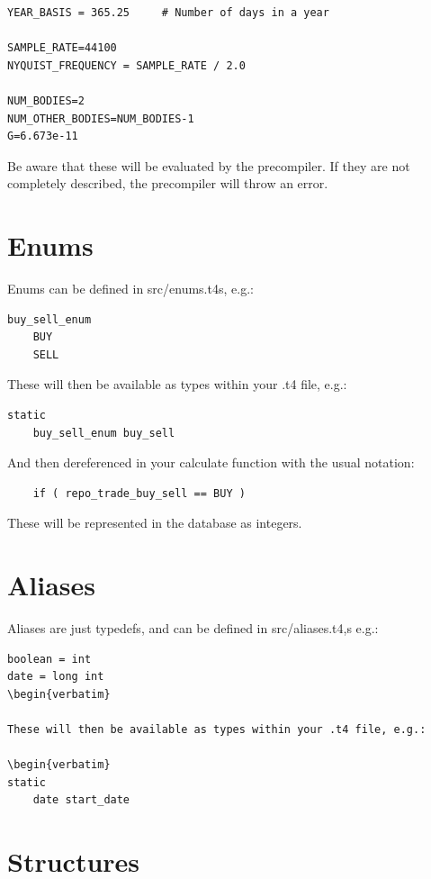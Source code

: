 \documentclass{report}
\begin{document}
\begin{verbatim}
YEAR_BASIS = 365.25     # Number of days in a year

SAMPLE_RATE=44100
NYQUIST_FREQUENCY = SAMPLE_RATE / 2.0

NUM_BODIES=2
NUM_OTHER_BODIES=NUM_BODIES-1
G=6.673e-11

\end{verbatim}

Be aware that these will be evaluated by the precompiler. If they are not completely described, the precompiler will throw an error.

\section{Enums}


Enums can be defined in src/enums.t4s, e.g.:
\begin{verbatim}
buy_sell_enum
    BUY
    SELL
\end{verbatim}

These will then be available as types within your .t4 file, e.g.:

\begin{verbatim}
static
    buy_sell_enum buy_sell
\end{verbatim}


And then dereferenced in your calculate function with the usual notation:
\begin{verbatim}
    if ( repo_trade_buy_sell == BUY ) 
\end{verbatim}

These will be represented in the database as integers.

\section{Aliases}

Aliases are just typedefs, and can be defined in src/aliases.t4,s e.g.:

\begin{verbatim}
boolean = int
date = long int
\begin{verbatim}

These will then be available as types within your .t4 file, e.g.:

\begin{verbatim}
static
    date start_date
\end{verbatim}




\section{Structures}
\end{document}
